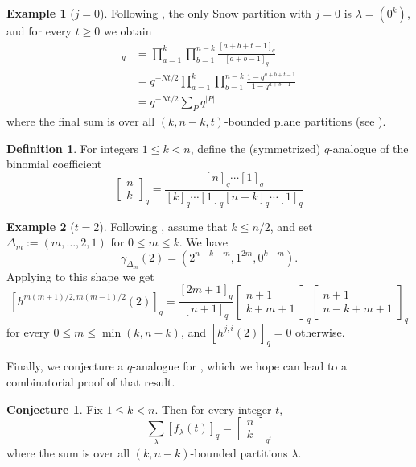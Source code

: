 \documentclass{amsart}
\theoremstyle{plain}
\theoremstyle{definition}
\newtheorem{definition}[definition]{Definition}
\newtheorem{example}[example]{Example}
\newtheorem{conjecture}[conjecture]{Conjecture}
\numberwithin{equation}{section}
\begin{document}
\begin{example}[$j=0$]
Following , the only Snow partition with $j=0$ is $\lambda=(0^k)$, and for every $t\geq 0$ we obtain
\begin{align*}[d_\lambda(t)]_q&=\prod_{a=1}^k\prod_{b=1}^{n-k}\frac{[a+b+t-1]_q}{[a+b-1]_q}\\
&=q^{-Nt/2}\prod_{a=1}^k\prod_{b=1}^{n-k}\frac{1-q^{a+b+t-1}}{1-q^{a+b-1}}\\
&=q^{-Nt/2}\sum_P q^{|P|}
\end{align*}
where the final sum is over all $(k,n-k,t)$-bounded plane partitions (see \cite{Mac86}).
\end{example}

\begin{definition}
For integers $1\leq k< n$, define the (symmetrized) $q$-analogue of the binomial coefficient
\[\begin{bmatrix}n\\k\end{bmatrix}_q=\frac{[n]_q\cdots [1]_q}{[k]_q\cdots [1]_q[n-k]_q\cdots [1]_q}\]
\end{definition}

\begin{example}[$t=2$]
    Following , assume that $k\leq n/2$, and set $\Delta_m:=(m,\dots,2,1)$ for $0\leq m\leq k$. We have
\[\gamma_{\Delta_m}(2)=(2^{n-k-m},1^{2m},0^{k-m}).\]
Applying  to this shape we get
\[[h^{m(m+1)/2,m(m-1)/2}(2)]_q=\frac{[2m+1]_q}{[n+1]_q}\begin{bmatrix}n+1\\k+m+1\end{bmatrix}_q\begin{bmatrix}n+1\\n-k+m+1\end{bmatrix}_q\]
for every $0\leq m\leq \min(k,n-k)$, and $[h^{j,i}(2)]_q=0$ otherwise.
\end{example}


Finally, we conjecture a $q$-analogue for , which we hope can lead to a combinatorial proof of that result.

\begin{conjecture}
    \label{con:q-euler-characteristic}
Fix $1\leq k< n$. Then for every integer $t$,
\[\sum_{\lambda}[f_{\lambda}(t)]_q=\begin{bmatrix}n\\k\end{bmatrix}_{q^t}\]
where the sum is over all $(k,n-k)$-bounded partitions $\lambda$.
\end{conjecture}


\printbibliography
\end{document}
